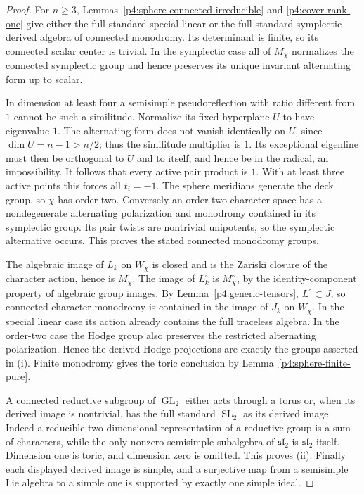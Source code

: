 \documentclass[11pt]{article}
\theoremstyle{plain}
\theoremstyle{definition}
\theoremstyle{remark}
\numberwithin{equation}{section}
\begin{document}
\begin{proof}
For $n\ge3$, Lemmas~\ref{p4:sphere-connected-irreducible} and
\ref{p4:cover-rank-one} give either the full standard special linear or
the full standard symplectic derived algebra of connected
monodromy.  Its determinant is finite, so its connected scalar
center is trivial.  In the symplectic case all of $M_\chi$
normalizes the connected symplectic group and hence preserves
its unique invariant alternating form up to scalar.

In dimension at least four a semisimple pseudoreflection with
ratio different from $1$ cannot be such a similitude.  Normalize
its fixed hyperplane $U$ to have eigenvalue $1$.  The alternating
form does not vanish identically on $U$, since $\dim U=n-1>n/2$;
thus the similitude multiplier is $1$.  Its exceptional eigenline
must then be orthogonal to $U$ and to itself, and hence be in the
radical, an impossibility.  It follows that every active pair
product is $1$.  With at least three active points this forces
all $t_i=-1$.  The sphere meridians generate the deck group, so
$\chi$ has order two.  Conversely an order-two character space
has a nondegenerate alternating polarization and monodromy
contained in its symplectic group.  Its pair twists are nontrivial
unipotents, so the symplectic alternative occurs.  This proves
the stated connected monodromy groups.

The algebraic image of $L_k$ on $W_\chi$ is closed and is the Zariski
closure of the character action, hence is $M_\chi$.  The image of
$L_k^\circ$ is $M_\chi^\circ$, by the identity-component property of
algebraic group images.  By Lemma~\ref{p4:generic-tensors},
$L^\circ\subset J$, so connected character monodromy is contained in
the image of $J_k$ on $W_\chi$.  In the special linear case its action already contains
the full traceless algebra.  In the order-two case the Hodge group
also preserves the restricted alternating polarization.  Hence
the derived Hodge projections are exactly the groups asserted
in (i).  Finite monodromy gives the toric conclusion by
Lemma~\ref{p4:sphere-finite-pure}.

A connected reductive subgroup of $\operatorname{GL}_2$ either acts through a
torus or, when its derived image is nontrivial, has the full
standard $\operatorname{SL}_2$ as its derived image.  Indeed a reducible
two-dimensional representation of a reductive group is a sum of
characters, while the only nonzero semisimple subalgebra of
$\mathfrak{sl}_2$ is $\mathfrak{sl}_2$ itself.  Dimension one is
toric, and dimension zero is omitted.  This proves (ii).
Finally each displayed derived image is simple, and a
surjective map from a semisimple Lie algebra to a simple one is
supported by exactly one simple ideal.
\end{proof}
\end{document}
